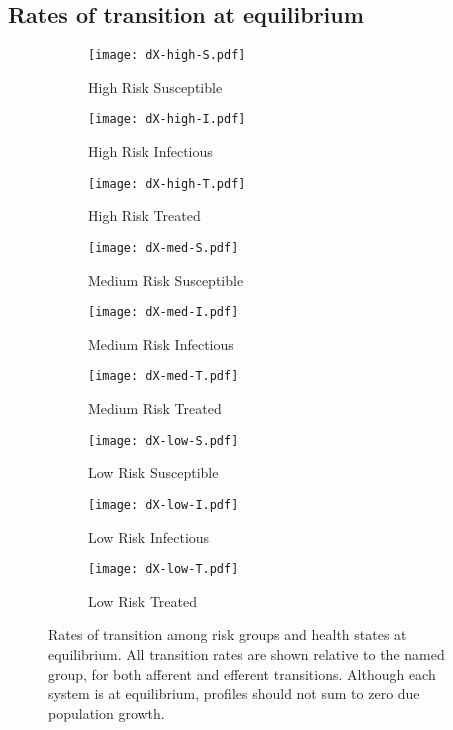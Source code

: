 \subsection{Rates of transition at equilibrium}
\label{aa:transitions}
\begin{figure}[H]
  \centering
  \begin{subfigure}{0.31\linewidth}
    \centering\texttt{[image: dX-high-S.pdf]}
    \caption{High Risk Susceptible}\label{fig:dX-high-S}
  \end{subfigure}
  \begin{subfigure}{0.31\linewidth}
    \centering\texttt{[image: dX-high-I.pdf]}
    \caption{High Risk Infectious}\label{fig:dX-high-I}
  \end{subfigure}
  \begin{subfigure}{0.31\linewidth}
    \centering\texttt{[image: dX-high-T.pdf]}
    \caption{High Risk Treated}\label{fig:dX-high-T}
  \end{subfigure}
  \begin{subfigure}{0.31\linewidth}
    \centering\texttt{[image: dX-med-S.pdf]}
    \caption{Medium Risk Susceptible}\label{fig:dX-med-S}
  \end{subfigure}
  \begin{subfigure}{0.31\linewidth}
    \centering\texttt{[image: dX-med-I.pdf]}
    \caption{Medium Risk Infectious}\label{fig:dX-med-I}
  \end{subfigure}
    \begin{subfigure}{0.31\linewidth}
    \centering\texttt{[image: dX-med-T.pdf]}
    \caption{Medium Risk Treated}\label{fig:dX-med-T}
  \end{subfigure}
  \begin{subfigure}{0.31\linewidth}
    \centering\texttt{[image: dX-low-S.pdf]}
    \caption{Low Risk Susceptible}\label{fig:dX-low-S}
  \end{subfigure}
  \begin{subfigure}{0.31\linewidth}
    \centering\texttt{[image: dX-low-I.pdf]}
    \caption{Low Risk Infectious}\label{fig:dX-low-I}
  \end{subfigure}
  \begin{subfigure}{0.31\linewidth}
    \centering\texttt{[image: dX-low-T.pdf]}
    \caption{Low Risk Treated}\label{fig:dX-low-T}
  \end{subfigure}
  \caption{Rates of transition among risk groups and health states at equilibrium.
    All transition rates are shown relative to the named group,
    for both afferent and efferent transitions.
    Although each system is at equilibrium,
    profiles should not sum to zero due population growth.}
\end{figure}
